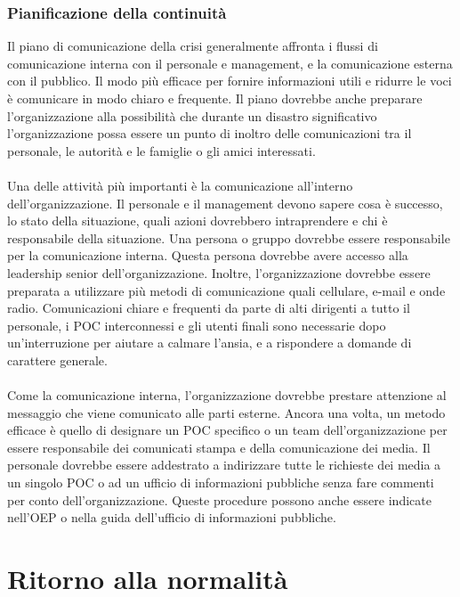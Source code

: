 \documentclass[12pt, a4paper, titlepage]{report}
\begin{document}
			\subsubsection{Pianificazione della continuità}
				Il piano di comunicazione della crisi generalmente affronta i flussi di comunicazione interna con il personale e management, e la comunicazione esterna con il pubblico. Il modo più efficace per fornire informazioni utili e ridurre le voci è comunicare in modo chiaro e frequente. Il piano dovrebbe anche preparare l'organizzazione alla possibilità che durante un disastro significativo l'organizzazione possa essere un punto di inoltro delle comunicazioni tra il personale, le autorità e le famiglie o gli amici interessati.\\
				\\Una delle attività più importanti è la comunicazione all'interno dell'organizzazione. Il personale e il management devono sapere cosa è successo, lo stato della situazione, quali azioni dovrebbero intraprendere e chi è responsabile della situazione. Una persona o gruppo dovrebbe essere responsabile per la comunicazione interna. Questa persona dovrebbe avere accesso alla leadership senior dell'organizzazione. Inoltre, l'organizzazione dovrebbe essere preparata a utilizzare più metodi di comunicazione quali cellulare, e-mail e onde radio. Comunicazioni chiare e frequenti da parte di alti dirigenti a tutto il personale, i POC interconnessi e gli utenti finali sono necessarie dopo un'interruzione per aiutare a calmare l'ansia, e a rispondere a domande di carattere generale.\\
				\\Come la comunicazione interna, l'organizzazione dovrebbe prestare attenzione al messaggio che viene comunicato alle parti esterne. Ancora una volta, un metodo efficace è quello di designare un POC specifico o un team dell'organizzazione per essere responsabile dei comunicati stampa e della comunicazione dei media. Il personale dovrebbe essere addestrato a indirizzare tutte le richieste dei media a un singolo POC o ad un ufficio di informazioni pubbliche senza fare commenti per conto dell'organizzazione. Queste procedure possono anche essere indicate nell'OEP o nella guida dell'ufficio di informazioni pubbliche.
				 
	\newpage
	
	\section{Ritorno alla normalità} \label{ran}
	
\end{document}
